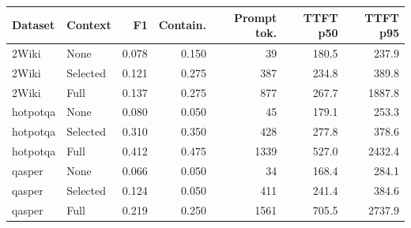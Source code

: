 \begin{tabular}{llrrrrr}
\toprule
Dataset & Context & F1 & Contain. & Prompt tok. & TTFT p50 & TTFT p95 \\
\midrule
2Wiki & None & 0.078 & 0.150 & 39 & 180.5 & 237.9 \\
2Wiki & Selected & 0.121 & 0.275 & 387 & 234.8 & 389.8 \\
2Wiki & Full & 0.137 & 0.275 & 877 & 267.7 & 1887.8 \\
hotpotqa & None & 0.080 & 0.050 & 45 & 179.1 & 253.3 \\
hotpotqa & Selected & 0.310 & 0.350 & 428 & 277.8 & 378.6 \\
hotpotqa & Full & 0.412 & 0.475 & 1339 & 527.0 & 2432.4 \\
qasper & None & 0.066 & 0.050 & 34 & 168.4 & 284.1 \\
qasper & Selected & 0.124 & 0.050 & 411 & 241.4 & 384.6 \\
qasper & Full & 0.219 & 0.250 & 1561 & 705.5 & 2737.9 \\
\bottomrule
\end{tabular}
